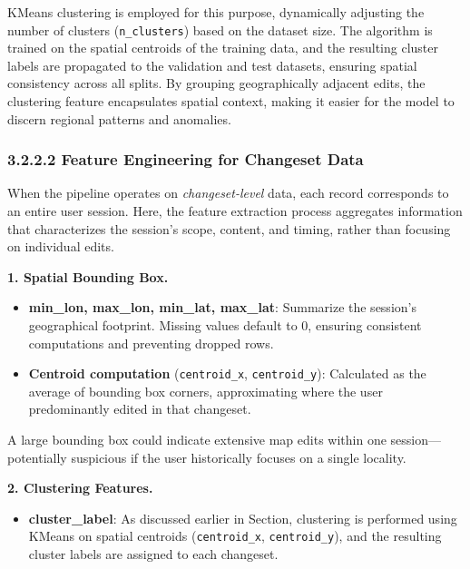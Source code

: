\documentclass[
    13pt, %
    a4paper, %
    DIV14, %
    listof=totoc, %
    bibliography=totoc, %
    index=totoc, %
    headsepline
]{scrreprt}
\begin{document}
KMeans clustering is employed for this purpose, dynamically adjusting the number of clusters (\texttt{n\_clusters}) based on the dataset size. The algorithm is trained on the spatial centroids of the training data, and the resulting cluster labels are propagated to the validation and test datasets, ensuring spatial consistency across all splits. By grouping geographically adjacent edits, the clustering feature encapsulates spatial context, making it easier for the model to discern regional patterns and anomalies.

\vspace{1.5em}

\subsubsection{3.2.2.2 Feature Engineering for Changeset Data}
\label{sec:features_changeset}

When the pipeline operates on \emph{changeset-level} data, each record corresponds to an entire user session. Here, the feature extraction process aggregates information that characterizes the session’s scope, content, and timing, rather than focusing on individual edits.

\vspace{1em}
\noindent
\textbf{1. Spatial Bounding Box.}
\begin{itemize}
  \item \textbf{min\_lon, max\_lon, min\_lat, max\_lat}: Summarize the session’s geographical footprint. Missing values default to 0, ensuring consistent computations and preventing dropped rows.
  \item \textbf{Centroid computation} (\texttt{centroid\_x}, \texttt{centroid\_y}): Calculated as the average of bounding box corners, approximating where the user predominantly edited in that changeset.
\end{itemize}
A large bounding box could indicate extensive map edits within one session—potentially suspicious if the user historically focuses on a single locality.

\vspace{1em}
\noindent
\textbf{2. Clustering Features.}
\begin{itemize}
  \item \textbf{cluster\_label}: As discussed earlier in Section, clustering is performed using KMeans on spatial centroids (\texttt{centroid\_x}, \texttt{centroid\_y}), and the resulting cluster labels are assigned to each changeset.
\end{itemize}
\end{document}
